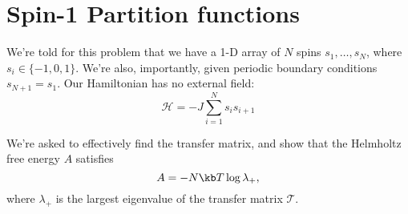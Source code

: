 \documentclass[../../PS3.tex]{subfiles}
\newcommand{\ham}{\mathcal{H}}
\newcommand{\trm}{\mathcal{T}}
\begin{document}
\section{Spin-1 Partition functions}

We're told for this problem that we have a 1-D array of $N$ spins $s_1,\dotsc, s_N$, where $s_i \in \{-1, 0, 1\}$. We're also, importantly, given periodic boundary conditions $s_{N+1} = s_1$.
Our Hamiltonian has no external field:
\begin{equation}
	\ham = - J \sum_{i=1}^{N} s_i s_{i+1}
\end{equation}

We're asked to effectively find the transfer matrix, and show that the Helmholtz free energy $A$ satisfies
\begin{equation}
	A = -N\kb T \log{\lambda_{+}},
\end{equation}
where $\lambda_{+}$ is the largest eigenvalue of the transfer matrix $\trm$.
\end{document}
